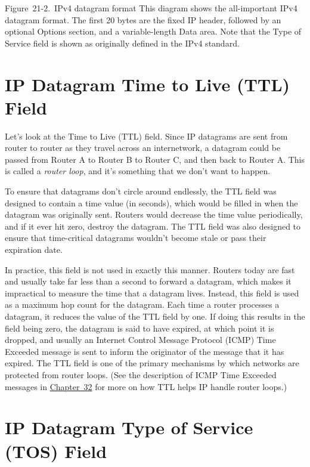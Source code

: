 Figure~21-2.~IPv4 datagram format This diagram shows the all-important
IPv4 datagram format. The first 20 bytes are the fixed IP header,
followed by an optional Options section, and a variable-length Data
area. Note that the Type of Service field is shown as originally defined
in the IPv4 standard.

\section{IP Datagram Time to Live (TTL) Field}

Let's look at the
Time to
Live (TTL) field. Since IP datagrams are sent from router to router as
they travel across an internetwork, a datagram could be passed from
Router A to Router B to Router C, and then back to Router A. This is
called a {\emph{router loop}}, and it's something that we don't want to
happen.

To ensure that datagrams don't circle around endlessly, the TTL
field was
designed to contain a time value (in seconds), which would be filled in
when the datagram was originally sent. Routers would decrease the time
value periodically, and if it ever hit zero, destroy the datagram. The
TTL field
was also designed to ensure that time-critical datagrams wouldn't become
stale or pass their expiration date.

In practice, this field is not used in exactly this manner. Routers
today are fast and usually take far less than a second to forward a
datagram, which makes it impractical to measure the time that a datagram
lives. Instead, this field is used as a maximum hop count for the
datagram. Each time a router processes a datagram, it reduces the value
of the TTL field by one. If doing this results in the field being zero,
the datagram is said to have expired, at which point it is dropped, and
usually an Internet Control Message Protocol (ICMP) Time Exceeded
message is sent to inform the originator of the message that it has
expired. The TTL field is one of the primary mechanisms by which
networks are protected from
router
loops. (See the description of ICMP Time Exceeded messages in
\protect\hyperlink{ch32.html}{Chapter~32} for more on how TTL helps IP
handle router
loops.)





\section{IP Datagram Type of Service (TOS) Field}

